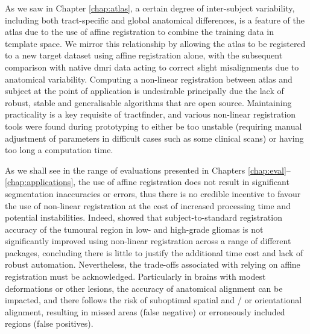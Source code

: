 As we saw in Chapter \ref{chap:atlas}, a certain degree of inter-subject variability, including both tract-specific and global anatomical differences, is a feature of the atlas due to the use of affine registration to combine the training data in template space.
We mirror this relationship by allowing the atlas to be registered to a new target dataset using affine registration alone, with the subsequent comparison with native \gls{dmri} data acting to correct slight misalignments due to anatomical variability.
Computing a non-linear registration between atlas and subject at the point of application is undesirable principally due the lack of robust, stable and generalisable algorithms that are open source.
Maintaining practicality is a key requisite of tractfinder, and various non-linear registration tools were found during prototyping to either be too unstable (requiring manual adjustment of parameters in difficult cases such as some clinical scans) or having too long a computation time\autocite{Visser2020}.

As we shall see in the range of evaluations presented in Chapters \ref{chap:eval}--\ref{chap:applications}, the use of affine registration does not result in significant segmentation inaccuracies or errors, thus there is no credible incentive to favour the use of non-linear registration at the cost of increased processing time and potential instabilities.
Indeed, \textcite{Visser2020} showed that subject-to-standard registration accuracy of the tumoural region in low- and high-grade gliomas is not significantly improved using non-linear registration across a range of different packages, concluding there is little to justify the additional time cost and lack of robust automation.
Nevertheless, the trade-offs associated with relying on affine registration must be acknowledged.
Particularly in brains with modest deformations or other lesions, the accuracy of anatomical alignment can be impacted, and there follows the risk of suboptimal spatial and / or orientational alignment, resulting in missed areas (false negative) or erroneously included regions (false positives).

